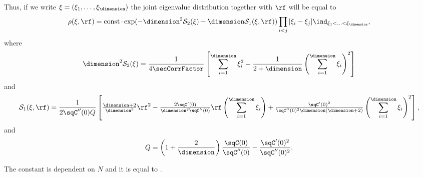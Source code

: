 Thus, if we write $\xi = (\xi_1, \ldots, \xi_\dimension)$ the joint eigenvalue distribution together with $\rf$ will be equal to 
\begin{align*}
    \rho(\xi,\rf) = \operatorname{const} \cdot \exp(- \dimension^2 \mathcal{S}_2(\xi) - \dimension \mathcal{S}_1 (\xi, \rf)) \prod_{i<j} |\xi_i - \xi_j| \ind_{\xi_1 < \ldots < \xi_\dimension},
\end{align*}
where
\begin{align*}
    \dimension^2 \mathcal{S}_2(\xi) = \frac{1}{4\secCorrFactor}  \left[ \sum_{i=1}^\dimension \xi_i^2 - \frac{1}{2+\dimension} \left(\sum_{i=1}^\dimension \xi_i \right)^2 \right]
\end{align*}
and
\begin{align*}
    \mathcal{S}_1(\xi, \rf) = \frac1{2\sqC''(0)Q}\left[
        \tfrac{\dimension+2}{\dimension^3}\rf^2
        - \tfrac{2\sqC'(0)}{\dimension^2\sqC''(0)}\rf\left(\sum_{i=1}^\dimension \xi_i \right)
        + \tfrac{\sqC'(0)^2}{\sqC''(0)^2\dimension(\dimension+2)}\left(\sum_{i=1}^\dimension \xi_i \right)^2
    \right],
\end{align*}
and
\[
	Q = \left(1+\frac2\dimension\right)
	\frac{\sqC(0)}{\sqC''(0)} - \frac{\sqC'(0)^2}{\sqC''(0)^2}.
\]

The constant is dependent on $N$ and it is equal to .